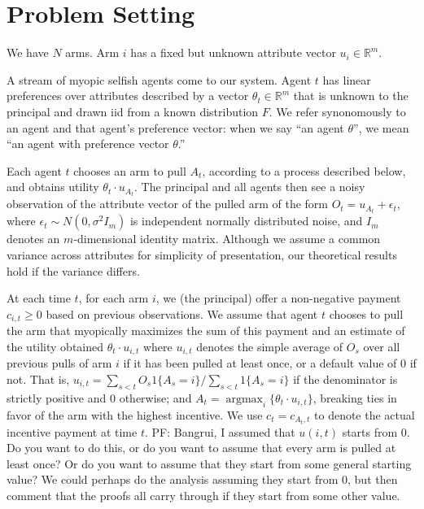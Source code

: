 \documentclass{article}
\newcommand{\argmax}{\mathop{\mathrm{argmax}}}
\newcommand{\pfcomment}[1]{{\color{blue}PF: #1}}
\begin{document}
\section{Problem Setting}
\label{sec:prob}

We have $N$ arms. Arm $i$ has a fixed but unknown attribute vector $u_i\in \mathbb{R}^{m}$. 

A stream of myopic selfish agents come to our system.  Agent $t$ has linear preferences over attributes described by a vector $\theta_t \in \mathbb{R}^m$ that is unknown to the principal and drawn iid from a known distribution $F$.  We refer synonomously to an agent and that agent's preference vector: when we say ``an agent $\theta$'', we mean ``an agent with preference vector $\theta$.''

Each agent $t$ chooses an arm to pull $A_t$, according to a process described below, and obtains utility $\theta_t \cdot u_{A_{t}}$.  The principal and all agents then see a noisy observation of the attribute vector of the pulled arm of the form $O_t=u_{A_{t}}+\epsilon_{t}$, where $\epsilon_t\sim N(0, \sigma^2 I_{m})$ is independent normally distributed noise, and $I_m$ denotes an $m$-dimensional identity matrix.  Although we assume a common variance across attributes for simplicity of presentation, our theoretical results hold if the variance differs.

At each time $t$, for each arm $i$, we (the principal) offer a non-negative payment $c_{i,t}\geq 0$ based on previous observations.
We assume that agent $t$ chooses to pull the arm that myopically maximizes the sum of this payment and an estimate of the utility obtained $\theta_t \cdot u_{i,t}$ where $u_{i,t}$ denotes the simple average of $O_s$ over all previous pulls of arm $i$ if it has been pulled at least once, or a default value of $0$ if not.  That is, $u_{i,t} = \sum_{s<t} O_s 1\{A_s = i\} / \sum_{s<t} 1\{A_s = i\}$ if the denominator is strictly positive and $0$ otherwise; and $A_t=\argmax_{i}\{\theta_t\cdot u_{i,t}\}$, breaking ties in favor of the arm with the highest incentive.  We use $c_t=c_{A_{t},t}$ to denote the actual incentive payment at time $t$.  \pfcomment{Bangrui, I assumed that $u(i,t)$ starts from $0$.  Do you want to do this, or do you want to assume that every arm is pulled at least once?  Or do you want to assume that they start from some general starting value?  We could perhaps do the analysis assuming they start from $0$, but then comment that the proofs all carry through if they start from some other value.}
\end{document}

